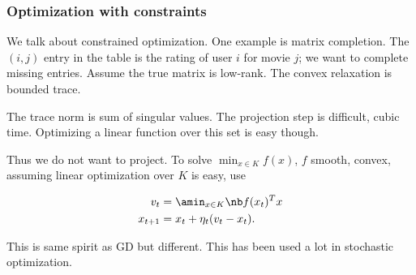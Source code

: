 \subsubsection{Optimization with constraints}

We talk about constrained optimization. One example is matrix completion. The $(i,j)$ entry in the table is the rating of user $i$ for movie $j$; we want to complete missing entries. Assume the true matrix is low-rank. The convex relaxation is bounded trace.

The trace norm is sum of singular values. The projection step is difficult, cubic time. %
Optimizing a linear function over this set is easy though. %

Thus we do not want to project. To solve $\min_{x\in K} f(x)$, $f$ smooth, convex, assuming linear optimization over $K$ is easy, use
\begin{alg}
\begin{align}
v_t&=\amin_{x\in K} \nb f(x_t)^T x\\
x_{t+1} &=x_t + \eta_t (v_t-x_t).
\end{align}
\end{alg}
This is same spirit as GD but different.
This has been used a lot in stochastic optimization.





